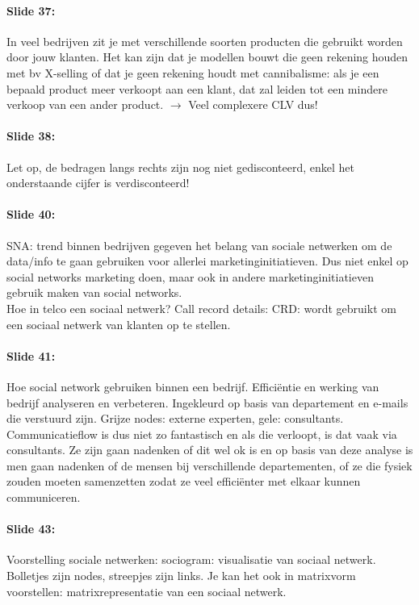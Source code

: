 \documentclass[10pt,a4paper]{report}
\begin{document}
\paragraph{Slide 37:}In veel bedrijven zit je met verschillende soorten producten die gebruikt worden door jouw klanten. Het kan zijn dat je modellen bouwt die geen rekening houden met bv X-selling of dat je geen rekening houdt met cannibalisme: als je een bepaald product meer verkoopt aan een klant, dat zal leiden tot een mindere verkoop van een ander product. $\rightarrow$ Veel complexere CLV dus!

\paragraph{Slide 38:}Let op, de bedragen langs rechts zijn nog niet gedisconteerd, enkel het onderstaande cijfer is verdisconteerd! 

\paragraph{Slide 40:}SNA: trend binnen bedrijven gegeven het belang van sociale netwerken om de data/info te gaan gebruiken voor allerlei marketinginitiatieven. Dus niet enkel op social networks marketing doen, maar ook in andere marketinginitiatieven gebruik maken van social networks.\\
Hoe in telco een sociaal netwerk? Call record details: CRD: wordt gebruikt om een sociaal netwerk van klanten op te stellen. 

\paragraph{Slide 41:}Hoe social network gebruiken binnen een bedrijf. Efficiëntie en werking van bedrijf analyseren en verbeteren. Ingekleurd op basis van departement en e-mails die verstuurd zijn. Grijze nodes: externe experten, gele: consultants. Communicatieflow is dus niet zo fantastisch en als die verloopt, is dat vaak via consultants. Ze zijn gaan nadenken of dit wel ok is en op basis van deze analyse is men gaan nadenken of de mensen bij verschillende departementen, of ze die fysiek zouden moeten samenzetten zodat ze veel efficiënter met elkaar kunnen communiceren.

\paragraph{Slide 43:}Voorstelling sociale netwerken: sociogram: visualisatie van sociaal netwerk. Bolletjes zijn nodes, streepjes zijn links. Je kan het ook in matrixvorm voorstellen: matrixrepresentatie van een sociaal netwerk.
\end{document}
